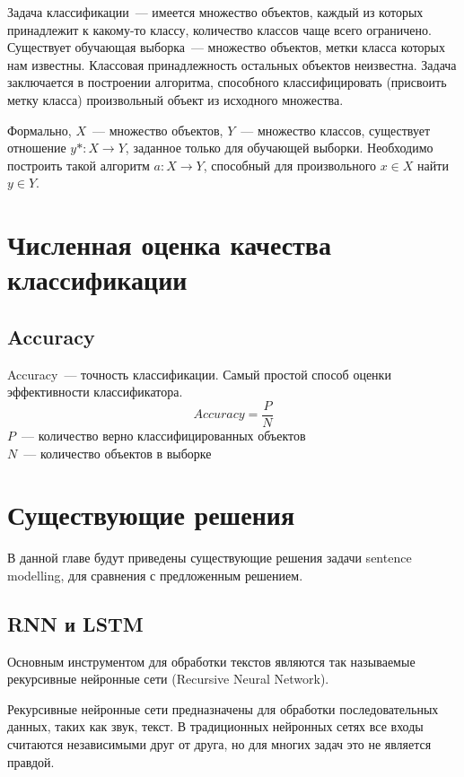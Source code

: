 Задача классификации~--- имеется множество объектов, каждый из которых принадлежит
к какому-то классу, количество классов чаще всего ограничено.
Существует обучающая выборка~--- множество объектов, метки
класса которых нам известны. Классовая принадлежность остальных объектов
неизвестна. Задача заключается в построении алгоритма, способного
классифицировать (присвоить метку класса) произвольный объект из исходного множества.

Формально, $X$~--- множество объектов, $Y$~--- множество классов,
существует отношение $y* : X \rightarrow Y$, заданное только для обучающей выборки.
Необходимо построить такой алгоритм $a: X \rightarrow Y$, способный для произвольного
$x \in X$ найти $y \in Y$.	

\section{Численная оценка качества классификации}

\subsection{Accuracy}
Accuracy~--- точность классификации. Самый простой способ оценки эффективности классификатора.
$$Accuracy =\frac{P}{N}$$
$P$~--- количество верно классифицированных объектов\\
$N$~--- количество объектов в выборке

\section{Существующие решения}

В данной главе будут приведены существующие решения задачи sentence modelling, для сравнения с предложенным решением.


\subsection{RNN и LSTM}
Основным инструментом для обработки текстов являются так называемые рекурсивные нейронные сети (Recursive Neural Network).

Рекурсивные нейронные сети предназначены для обработки последовательных данных, таких как звук, текст. В традиционных нейронных сетях все входы считаются независимыми друг от друга, но для многих задач это не является правдой.

